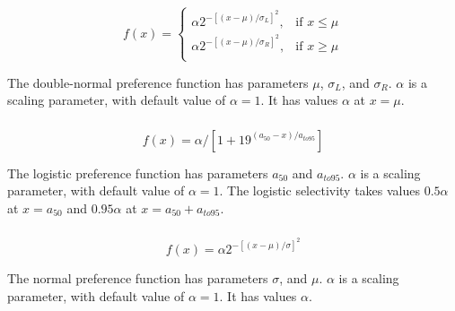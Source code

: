 \subsubsection[Double-normal]{}

\begin{equation}
f(x) = \begin{cases}
\alpha 2^{-[(x- \mu)/\sigma_L ]^2}, & \text{if $x \leq \mu$} \\
\alpha 2^{-[(x- \mu)/\sigma_R ]^2}, & \text{if $x \ge \mu$}\\
\end{cases}
\end{equation} 

The double-normal preference function has parameters $\mu$, $\sigma_L$, and $\sigma_R$. $\alpha$ is a scaling parameter, with default value of $\alpha = 1$. It has values $\alpha$ at $x=\mu$.

\subsubsection[Logistic]{}

\begin{equation}
f(x) = \alpha / [1+19^{(a_{50}-x)/a_{to95}}]
\end{equation}

The logistic preference function has parameters $a_{50}$ and $a_{to95}$. $\alpha$ is a scaling parameter, with default value of $\alpha = 1$. The logistic selectivity takes values $0.5 \alpha$ at $x=a_{50}$ and $0.95 \alpha$ at $x=a_{50}+a_{to95}$. 

\subsubsection[Normal]{}

\begin{equation}
f(x) = 
\alpha 2^{-[(x- \mu)/\sigma]^2}
\end{equation} 

The normal preference function has parameters  $\sigma$, and $\mu$. $\alpha$ is a scaling parameter, with default value of $\alpha = 1$. It has values $\alpha$.

\subsection{\label{sec:time_var}}

